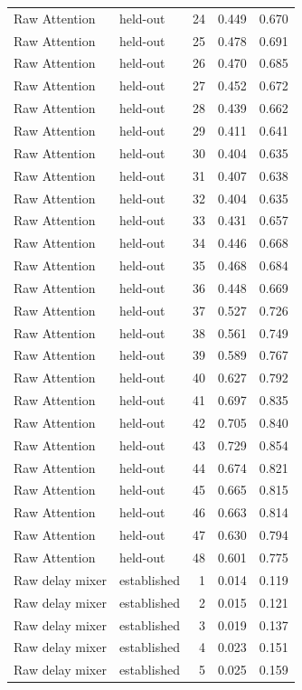 \begin{tabular}{llrrr}
Raw Attention & held-out & 24 & 0.449 & 0.670 \\
Raw Attention & held-out & 25 & 0.478 & 0.691 \\
Raw Attention & held-out & 26 & 0.470 & 0.685 \\
Raw Attention & held-out & 27 & 0.452 & 0.672 \\
Raw Attention & held-out & 28 & 0.439 & 0.662 \\
Raw Attention & held-out & 29 & 0.411 & 0.641 \\
Raw Attention & held-out & 30 & 0.404 & 0.635 \\
Raw Attention & held-out & 31 & 0.407 & 0.638 \\
Raw Attention & held-out & 32 & 0.404 & 0.635 \\
Raw Attention & held-out & 33 & 0.431 & 0.657 \\
Raw Attention & held-out & 34 & 0.446 & 0.668 \\
Raw Attention & held-out & 35 & 0.468 & 0.684 \\
Raw Attention & held-out & 36 & 0.448 & 0.669 \\
Raw Attention & held-out & 37 & 0.527 & 0.726 \\
Raw Attention & held-out & 38 & 0.561 & 0.749 \\
Raw Attention & held-out & 39 & 0.589 & 0.767 \\
Raw Attention & held-out & 40 & 0.627 & 0.792 \\
Raw Attention & held-out & 41 & 0.697 & 0.835 \\
Raw Attention & held-out & 42 & 0.705 & 0.840 \\
Raw Attention & held-out & 43 & 0.729 & 0.854 \\
Raw Attention & held-out & 44 & 0.674 & 0.821 \\
Raw Attention & held-out & 45 & 0.665 & 0.815 \\
Raw Attention & held-out & 46 & 0.663 & 0.814 \\
Raw Attention & held-out & 47 & 0.630 & 0.794 \\
Raw Attention & held-out & 48 & 0.601 & 0.775 \\
Raw delay mixer & established & 1 & 0.014 & 0.119 \\
Raw delay mixer & established & 2 & 0.015 & 0.121 \\
Raw delay mixer & established & 3 & 0.019 & 0.137 \\
Raw delay mixer & established & 4 & 0.023 & 0.151 \\
Raw delay mixer & established & 5 & 0.025 & 0.159 \\

\end{tabular}
